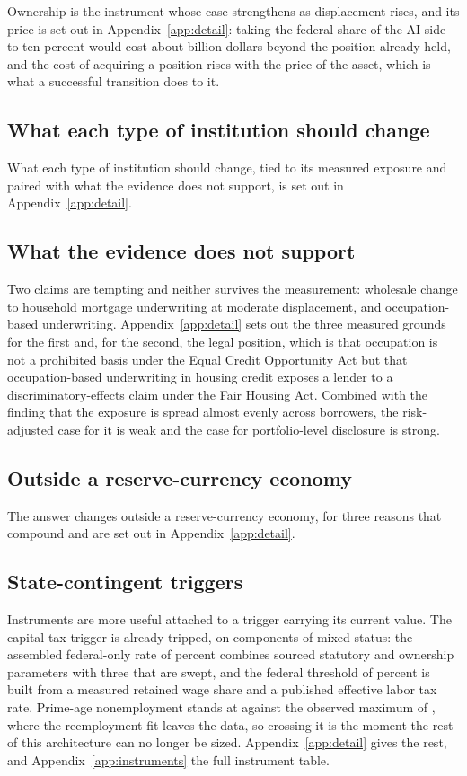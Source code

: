 Ownership is the instrument whose case strengthens as displacement rises, and its price is set out
in Appendix~\ref{app:detail}: taking the federal share of the AI side to ten percent would cost
about  billion dollars beyond the position already held, and the cost
of acquiring a position rises with the price of the asset, which is what a successful transition
does to it.

\subsection{What each type of institution should change}

What each type of institution should change, tied to its measured exposure and paired with what the evidence does not support, is set out in Appendix~\ref{app:detail}.


\subsection{What the evidence does not support}

Two claims are tempting and neither survives the measurement: wholesale change to household mortgage underwriting at moderate displacement, and occupation-based underwriting. Appendix~\ref{app:detail} sets out the three measured grounds for the first and, for the second, the legal position, which is that occupation is not a prohibited basis under the Equal Credit Opportunity Act but that occupation-based underwriting in housing credit exposes a lender to a discriminatory-effects claim under the Fair Housing Act. Combined with the finding that the exposure is spread almost evenly across borrowers, the risk-adjusted case for it is weak and the case for portfolio-level disclosure is strong.


\subsection{Outside a reserve-currency economy}

The answer changes outside a reserve-currency economy, for three reasons that compound and are set
out in Appendix~\ref{app:detail}.

\subsection{State-contingent triggers}

Instruments are more useful attached to a trigger carrying its current value. The capital tax trigger is already tripped, on components of mixed status: the assembled federal-only rate of  percent combines sourced statutory and ownership parameters with three that are swept, and the federal threshold of  percent is built from a measured retained wage share and a published effective labor tax rate. Prime-age nonemployment stands at  against the observed maximum of , where the reemployment fit leaves the data, so crossing it is the moment the rest of this architecture can no longer be sized. Appendix~\ref{app:detail} gives the rest, and Appendix~\ref{app:instruments} the full instrument table.


